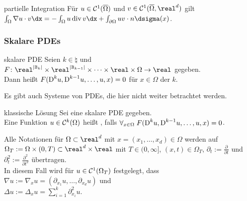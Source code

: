 \begin{Satz}{partielle Integration}
    Für $u \in \mathcal{C}^1(\overline{\Omega})$ und $v \in \C^1(\overline{\Omega}, \real^d)$ gilt\\
    $\int_\Omega \nabla u \cdot v \dx = -\int_\Omega u \div v \dx +
    \int_{\partial\Omega} uv \cdot n \dsigma(x)$.
\end{Satz}

\subsubsection{%
    Skalare PDEs%
}

\begin{Def}{skalare PDE}
    Seien $k \in \natural$ und
    $F\colon \real^{|\BB_k|} \times \real^{|\BB_{k-1}|} \times \dotsb
    \times \real \times \Omega \to \real$
    gegeben.\\
    Dann heißt $F(\text{D}^k u, \text{D}^{k-1} u, \dotsc, u, x) = 0$ für $x \in \Omega$
     der  $k$.
\end{Def}

\begin{Bem}
    Es gibt auch Systeme von PDEs, die hier nicht weiter betrachtet werden.
\end{Bem}

\begin{Def}{klassische Lösung}
    Sei eine skalare PDE gegeben.\\
    Eine Funktion $u \in \mathcal{C}^k(\Omega)$ heißt , falls
    $\forall_{x \in \Omega}\; F(\text{D}^k u, \text{D}^{k-1} u, \dotsc, u, x) = 0$.
\end{Def}

\begin{Bem}
    Alle Notationen für $\Omega \subset \real^d$ mit $x = (x_1, \dotsc, x_d) \in \Omega$ werden
    auf  $\Omega_T := \Omega \times (0, T) \subset \real^d \times \real$
    mit $T \in (0, \infty]$, $(x, t) \in \Omega_T$, $\partial_t := \frac{\partial}{\partial t}$
    und $\partial_t^2 := \frac{\partial^2}{\partial t^2}$ übertragen.\\
    In diesem Fall wird für $u \in \mathcal{C}^1(\Omega_T)$ festgelegt, dass
    $\nabla u := \nabla_x u = (\partial_{x_1} u, \dotsc, \partial_{x_d} u)$ und\\
    $\Delta u := \Delta_x u = \sum_{i=1}^k \partial_{x_i}^2 u$.
\end{Bem}

\pagebreak

